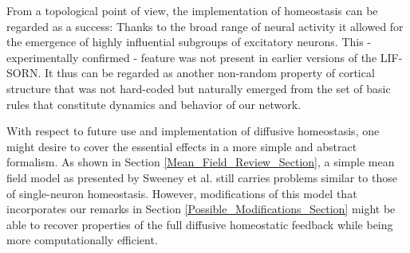 \documentclass[10pt,a4paper]{article}
\begin{document}
From a topological point of view, the implementation of homeostasis can be regarded as a success: Thanks to the broad range of neural activity it allowed for the emergence of highly influential subgroups of excitatory neurons. This - experimentally confirmed - feature was not present in earlier versions of the LIF-SORN. It thus can be regarded as another non-random property of cortical structure that was not hard-coded but naturally emerged from the set of basic rules that constitute dynamics and behavior of our network.

With respect to future use and implementation of diffusive homeostasis, one might desire to cover the essential effects in a more simple and abstract formalism. As shown in Section \ref{Mean_Field_Review_Section}, a simple mean field model as presented by Sweeney et al. still carries problems similar to those of single-neuron homeostasis. However, modifications of this model that incorporates our remarks in Section \ref{Possible_Modifications_Section} might be able to recover properties of the full diffusive homeostatic feedback while being more computationally efficient.   

\clearpage


\end{document}
